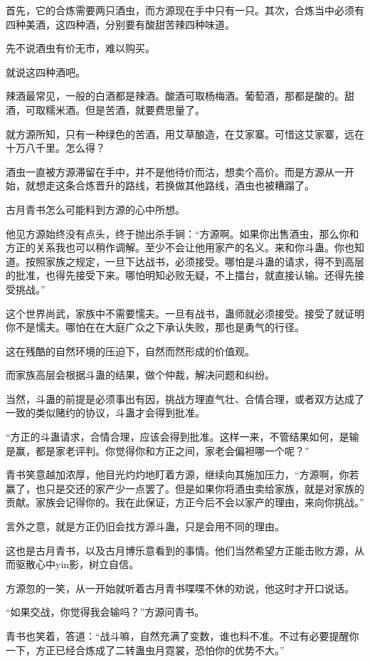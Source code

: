 \begin{this_body}
首先，它的合炼需要两只酒虫，而方源现在手中只有一只。其次，合炼当中必须有四种美酒，这四种酒，分别要有酸甜苦辣四种味道。

先不说酒虫有价无市，难以购买。

就说这四种酒吧。

辣酒最常见，一般的白酒都是辣酒。酸酒可取杨梅酒。葡萄酒，那都是酸的。甜酒，可取糯米酒。但是苦酒，就要费思量了。

就方源所知，只有一种绿色的苦酒，用艾草酿造，在艾家寨。可惜这艾家寨，远在十万八千里。怎么得？

酒虫一直被方源滞留在手中，并不是他待价而沽，想卖个高价。而是方源从一开始，就想走这条合炼晋升的路线，若换做其他路线，酒虫也被糟蹋了。

古月青书怎么可能料到方源的心中所想。

他见方源始终没有点头，终于抛出杀手锏：“方源啊。如果你出售酒虫，那么你和方正的关系我也可以稍作调解。至少不会让他用家产的名义。来和你斗蛊。你也知道。按照家族之规定，一旦下达战书，必须接受。哪怕是斗蛊的请求，得不到高层的批准，也得先接受下来。哪怕明知必败无疑，不上擂台，就直接认输。还得先接受挑战。”

这个世界尚武，家族中不需要懦夫。一旦有战书，蛊师就必须接受。接受了就证明你不是懦夫。哪怕在在大庭广众之下承认失败，那也是勇气的行径。

这在残酷的自然环境的压迫下，自然而然形成的价值观。

而家族高层会根据斗蛊的结果，做个仲裁，解决问题和纠纷。

当然，斗蛊的前提是必须事出有因，挑战方理直气壮、合情合理，或者双方达成了一致的类似赌约的协议，斗蛊才会得到批准。

“方正的斗蛊请求，合情合理，应该会得到批准。这样一来，不管结果如何，是输是赢，都是家老评判。你觉得你和方正之间，家老会偏袒哪一个呢？”

青书笑意越加浓厚，他目光灼灼地盯着方源，继续向其施加压力，“方源啊，你若赢了，也只是交还的家产少一点罢了。但是如果你将酒虫卖给家族，就是对家族的贡献。家族会记得你的。我在此保证，方正今后不会以家产的理由，来向你挑战。”

言外之意，就是方正仍旧会找方源斗蛊，只是会用不同的理由。

这也是古月青书，以及古月博乐意看到的事情。他们当然希望方正能击败方源，从而驱散心中yin影，树立自信。

方源忽的一笑，从一开始就听着古月青书喋喋不休的劝说，他这时才开口说话。

“如果交战，你觉得我会输吗？”方源问青书。

青书也笑着，答道：“战斗嘛，自然充满了变数，谁也料不准。不过有必要提醒你一下，方正已经合炼成了二转蛊虫月霓裳，恐怕你的优势不大。”


\end{this_body}
